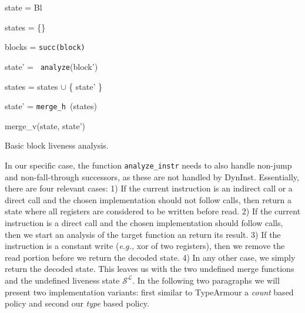 \begin{algorithm}[h!]
 	\SetAlgoLined
        \BlankLine
	{
 	state = Bl                                                  
 	

	states = \{\}                                               
	
	blocks = \texttt{succ(block)}                                        
	
	 {
	
 		state' = \texttt{ analyze}(block') 
 		
		states = states $\cup$ \{ state' \} 
	}

	state' = \texttt{merge\_h }(states)	

	\Return merge\_v(state, state')                             

	}
\caption{Basic block liveness analysis.}
\label{alg:liveness}
\end{algorithm}

In our specific case, the function \texttt{analyze\_instr} needs to also handle non-jump and non-fall-through successors, as these are not handled by DynInst. 
Essentially, there are four relevant cases: 1) If the current instruction is an indirect call or a direct call and the chosen implementation should not follow calls, 
then return a state where all registers are considered to be written before read. 2) If the current instruction is a direct call and the chosen implementation should follow calls, 
then we start an analysis of the target function an return its result. 3) If the instruction is a constant write (\textit{e.g.,} xor of two registers), 
then we remove the read portion before we return the decoded state. 4) In any other case, we simply return the decoded state.
This leaves us with the two undefined merge functions and the undefined liveness state $\mathcal{S}^\mathcal{L}$. In the following two paragraphs we will present two 
implementation variants: first similar to TypeArmour a \emph{count} based policy and second our \emph{type} based policy.

